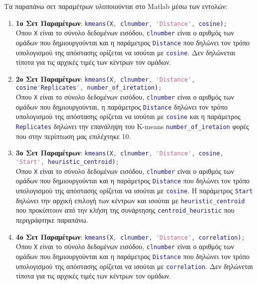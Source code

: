 Τα παραπάνω σετ παραμέτρων υλοποιούνται στο Matlab μέσω των εντολών:
\begin{enumerate}
\item \textbf{1ο Σετ Παραμέτρων}:
\lstinline[language=MATLAB, breaklines=true]!kmeans(X, clnumber, 'Distance', cosine);!
\\Όπου \lstinline[language=MATLAB]!X! είναι το σύνολο δεδομένων εισόδου,
\lstinline[language=MATLAB]!clnumber! είναι ο αριθμός των ομάδων που δημιουργούνται και η παράμετρος
\lstinline[language=MATLAB]!Distance! που δηλώνει τον τρόπο υπολογισμού της απόστασης ορίζεται να ισούται με \lstinline[language=MATLAB]!cosine!. Δεν δηλώνεται τίποτα για τις αρχικές τιμές των κέντρων τον ομάδων.

\item \textbf{2ο Σετ Παραμέτρων}:
\lstinline[language=MATLAB, breaklines=true]!kmeans(X, clnumber, 'Distance', cosine'Replicates', number_of_iretation);!
\\Όπου
\lstinline[language=MATLAB]!X! είναι το σύνολο δεδομένων εισόδου,
\lstinline[language=MATLAB]!clnumber! είναι ο αριθμός των ομάδων που δημιουργούνται, η παράμετρος
\lstinline[language=MATLAB]!Distance! δηλώνει τον τρόπο υπολογισμού της απόστασης ορίζεται να ισούται με
\lstinline[language=MATLAB]!cosine! και η παράμετρος
\lstinline[language=MATLAB]!Replicates! δηλώνει την επανάληψη του K-means
\lstinline[language=MATLAB]!number_of_iretaion! φορές που στην περίπτωση μας επιλέχτηκε 10.

\item \textbf{3ο Σετ Παραμέτρων}:
\lstinline[language=MATLAB, breaklines=true]!kmeans(X, clnumber, 'Distance', cosine, 'Start', heuristic_centroid);!
\\Όπου
\lstinline[language=MATLAB]!X! είναι το σύνολο δεδομένων εισόδου,
\lstinline[language=MATLAB]!clnumber! είναι ο αριθμός των ομάδων που δημιουργούνται και η παράμετρος
\lstinline[language=MATLAB]!Distance! που δηλώνει τον τρόπο υπολογισμού της απόστασης ορίζεται να ισούται με
\lstinline[language=MATLAB]!cosine!.
Η παράμετρος \lstinline[language=MATLAB]!Start! δηλώνει την αρχική επιλογή των κέντρων και ισούται με \lstinline[language=MATLAB]!heuristic_centroid! που προκύπτουν από την κλήση της συνάρτησης \lstinline[language=MATLAB]!centroid_heuristic! που περιγράφτηκε παραπάνω.

\item \textbf{4ο Σετ Παραμέτρων}:
\lstinline[language=MATLAB, breaklines=true]!kmeans(X, clnumber, 'Distance', correlation);!
\\Όπου
\lstinline[language=MATLAB]!X! είναι το σύνολο δεδομένων εισόδου,
\lstinline[language=MATLAB]!clnumber! είναι ο αριθμός των ομάδων που δημιουργούνται και η παράμετρος
\lstinline[language=MATLAB]!Distance! που δηλώνει τον τρόπο υπολογισμού της απόστασης ορίζεται να ισούται με
\lstinline[language=MATLAB]!correlation!.
Δεν δηλώνεται τίποτα για τις αρχικές τιμές των κέντρων τον ομάδων.


\end{enumerate}

